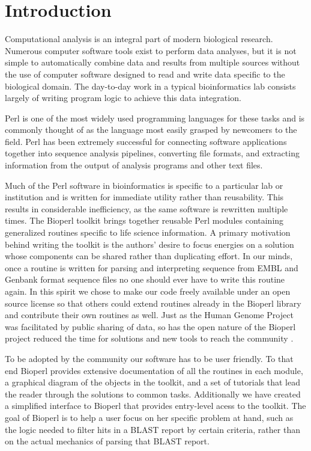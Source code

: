 \documentclass[12pt]{article}
\begin{document}
\section{Introduction}

Computational analysis is an integral part of modern biological
research.  Numerous computer software tools exist to perform data
analyses, but it is not simple to automatically combine data and
results from multiple sources without the use of computer software
designed to read and write data specific to the biological domain.
The day-to-day work in a typical bioinformatics lab consists largely
of writing program logic to achieve this data integration.

Perl is one of the most widely used programming languages for these
tasks and is commonly thought of as the language most easily grasped
by newcomers to the field.  Perl has been extremely successful for
connecting software applications together into sequence analysis
pipelines, converting file formats, and extracting information from
the output of analysis programs and other text files.

Much of the Perl software in bioinformatics is specific to a
particular lab or institution and is written for immediate utility
rather than reusability.  This results in considerable inefficiency,
as the same software is rewritten multiple times.  The Bioperl toolkit
brings together reusable Perl modules containing generalized routines
specific to life science information.  A primary motivation behind
writing the toolkit is the authors' desire to focus energies on a
solution whose components can be shared rather than duplicating
effort.  In our minds, once a routine is written for parsing and
interpreting sequence from EMBL and Genbank format sequence files no
one should ever have to write this routine again.  In this spirit we
chose to make our code freely available under an open source license
\cite{open-source-ref} so that others could extend routines already in
the Bioperl library and contribute their own routines as well.  Just
as the Human Genome Project was facilitated by public sharing of data,
so has the open nature of the Bioperl project reduced the time for
solutions and new tools to reach the community \cite{waterston}.

To be adopted by the community our software has to be user friendly.
To that end Bioperl provides extensive documentation of all the
routines in each module, a graphical diagram of the objects in the
toolkit, and a set of tutorials that lead the reader through the
solutions to common tasks.  Additionally we have created a simplified
interface to Bioperl that provides entry-level acess to the toolkit.
The goal of Bioperl is to help a user focus on her specific problem at
hand, such as the logic needed to filter hits in a BLAST \cite{blast}
report by certain criteria, rather than on the actual mechanics of
parsing that BLAST report.
\end{document}
